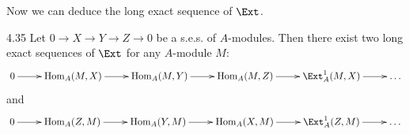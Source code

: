 \documentclass[twoside = false,	%
		headsepline,		%
		parskip = true,
		]{scrbook}						%
\begin{document}
    Now we can deduce the long exact sequence of $\Ext$.

    \begin{corollary}{}{4.35}
        Let $0 \to X \to Y \to Z \to 0$ be a s.e.s. of $A$-modules. Then there exist two long exact sequences of $\Ext$ for any $A$-module $M$:
        \begin{equation*}
        \xymatrix {
        0 \ar[r] & \Hom_A(M,X) \ar[r] & \Hom_A(M,Y) \ar[r] & \Hom_A(M,Z) \ar[r] & \Ext_A^1(M,X) \ar[r] & \dots 
        }
        \end{equation*}
        and
        \begin{equation*}
        \xymatrix{
            0 \ar[r] & \Hom_A(Z,M) \ar[r] & \Hom_A(Y,M) \ar[r] & \Hom_A(X,M) \ar[r] & \Ext_A^1(Z,M) \ar[r] & \dots
        }
        \end{equation*}
    \end{corollary}
\end{document}
